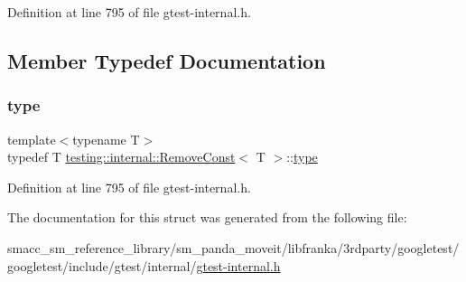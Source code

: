 Definition at line 795 of file gtest-\/internal.\+h.



\subsection{Member Typedef Documentation}
\mbox{\label{structtesting_1_1internal_1_1RemoveConst_a1be32027ea4edcc0d15abd59aba4a97f}} 
\subsubsection{\texorpdfstring{type}{type}}
{\footnotesize\ttfamily template$<$typename T$>$ \\
typedef T \hyperlink{structtesting_1_1internal_1_1RemoveConst}{testing\+::internal\+::\+Remove\+Const}$<$ T $>$\+::\hyperlink{structtesting_1_1internal_1_1RemoveConst_a1be32027ea4edcc0d15abd59aba4a97f}{type}}



Definition at line 795 of file gtest-\/internal.\+h.



The documentation for this struct was generated from the following file\+:\begin{DoxyCompactItemize}
\item 
smacc\+\_\+sm\+\_\+reference\+\_\+library/sm\+\_\+panda\+\_\+moveit/libfranka/3rdparty/googletest/googletest/include/gtest/internal/\hyperlink{gtest-internal_8h}{gtest-\/internal.\+h}\end{DoxyCompactItemize}
